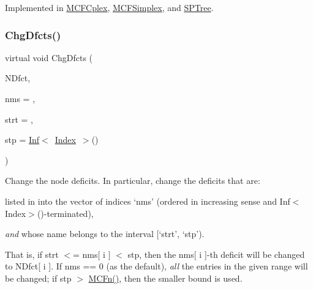 Implemented in \mbox{\hyperlink{class_m_c_f_cplex_ac4849627bb960b6c55f4b0f4e931b48b}{M\+C\+F\+Cplex}}, \mbox{\hyperlink{class_m_c_f_simplex_accd5dce260eb9999c08e5749b693b5f4}{M\+C\+F\+Simplex}}, and \mbox{\hyperlink{class_s_p_tree_accd5dce260eb9999c08e5749b693b5f4}{S\+P\+Tree}}.

\mbox{\label{class_m_c_f_class_a50ee5aaf0f8b39a1edec078828ade458}} 
\subsubsection{\texorpdfstring{Chg\+Dfcts()}{ChgDfcts()}}
{\footnotesize\ttfamily virtual void Chg\+Dfcts (\begin{DoxyParamCaption}\item[{\mbox{\hyperlink{class_m_c_f_class_ad325f3193dbba0ddef1da4e72d29eda6}{c\+F\+Row}}}]{N\+Dfct,  }\item[{\mbox{\hyperlink{class_m_c_f_class_a81575b2d4e4d5636b17170432150ae69}{c\+Index\+\_\+\+Set}}}]{nms = {},  }\item[{\mbox{\hyperlink{class_m_c_f_class_a76aaabb20535c51a2752b93f6c38fe54}{c\+Index}}}]{strt = {},  }\item[{\mbox{\hyperlink{class_m_c_f_class_ad53d6229d7ec28555a9c9c2fd9abf773}{Index}}}]{stp = {\ttfamily \mbox{\hyperlink{class_o_p_ttypes__di__unipi__it_1_1_inf}{Inf}}$<$~\mbox{\hyperlink{class_m_c_f_class_ad53d6229d7ec28555a9c9c2fd9abf773}{Index}}~$>$()} }\end{DoxyParamCaption})\hspace{0.3cm}{\ttfamily [pure virtual]}}

Change the node deficits. In particular, change the deficits that are\+:


\begin{DoxyItemize}
\item listed in into the vector of indices `nms' (ordered in increasing sense and Inf$<$\+Index$>$()-\/terminated),
\item {\itshape and} whose name belongs to the interval \mbox{[}`strt', `stp').
\end{DoxyItemize}

That is, if strt $<$= nms\mbox{[} i \mbox{]} $<$ stp, then the nms\mbox{[} i \mbox{]}-\/th deficit will be changed to N\+Dfct\mbox{[} i \mbox{]}. If nms == 0 (as the default), {\itshape all} the entries in the given range will be changed; if stp $>$ \mbox{\hyperlink{class_m_c_f_class_a6438187f454e795c03a850bfab31be84}{M\+C\+Fn()}}, then the smaller bound is used.

